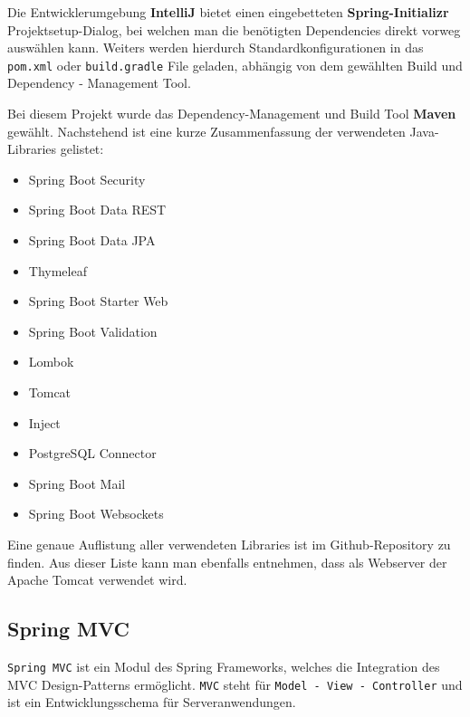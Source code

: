 \documentclass[paper=a4,12pt]{scrreprt}
\begin{document}
Die Entwicklerumgebung \textbf{IntelliJ}\cite{intellij} bietet einen eingebetteten \textbf{Spring-Initializr}\cite{spring_init} Projektsetup-Dialog, bei welchen man die benötigten Dependencies direkt vorweg auswählen kann. Weiters werden
hierdurch Standardkonfigurationen in das \texttt{pom.xml} oder \texttt{build.gradle} File geladen, abhängig von dem gewählten Build und Dependency - Management Tool.\newline

Bei diesem Projekt wurde das Dependency-Management und Build Tool \textbf{Maven}\cite{maven} gewählt. Nachstehend ist eine kurze Zusammenfassung der verwendeten Java-Libraries gelistet:\newline

\begin{itemize}
  \item Spring Boot Security\cite{spring_sec}
  \item Spring Boot Data REST\cite{spring_rest}
  \item Spring Boot Data JPA\cite{spring_jpa}
  \item Thymeleaf\cite{thymeleaf}
  \item Spring Boot Starter Web\cite{spring_web}
  \item Spring Boot Validation\cite{spring_valid}
  \item Lombok\cite{lombok}
  \item Tomcat\cite{tomcat}
  \item Inject\cite{dep_inj}
  \item PostgreSQL Connector\cite{postgres}
  \item Spring Boot Mail
  \item Spring Boot Websockets
\end{itemize}

Eine genaue Auflistung aller verwendeten Libraries ist im Github-Repository \cite{git_spring} zu finden.\newline
Aus dieser Liste kann man ebenfalls entnehmen, dass als Webserver der Apache Tomcat verwendet wird.\newline

\subsection{Spring MVC}

\texttt{Spring MVC}\cite{mvc} ist ein Modul des Spring Frameworks, welches die Integration des MVC Design-Patterns ermöglicht. \texttt{MVC} steht für \texttt{Model - View - Controller} und ist ein Entwicklungsschema für Serveranwendungen.\newline
\end{document}
